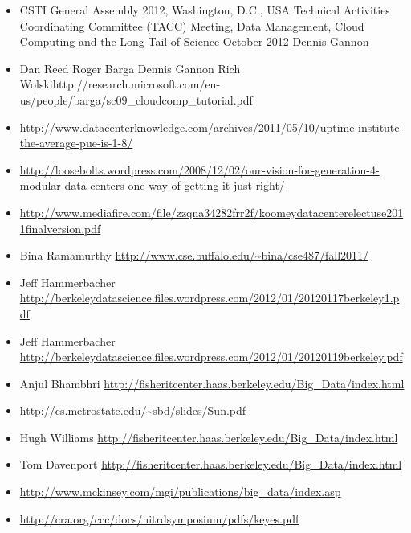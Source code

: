 \begin{itemize}

\item
  CSTI General Assembly 2012, Washington, D.C., USA Technical Activities
  Coordinating Committee (TACC) Meeting, Data Management, Cloud
  Computing and the Long Tail of Science October 2012 Dennis Gannon
\item
  Dan Reed Roger Barga Dennis Gannon Rich
  Wolskihttp://research.microsoft.com/en-us/people/barga/sc09\_cloudcomp\_tutorial.pdf
\item
  \url{http://www.datacenterknowledge.com/archives/2011/05/10/uptime-institute-the-average-pue-is-1-8/}
\item
  \url{http://loosebolts.wordpress.com/2008/12/02/our-vision-for-generation-4-modular-data-centers-one-way-of-getting-it-just-right/}
\item
  \url{http://www.mediafire.com/file/zzqna34282frr2f/koomeydatacenterelectuse2011finalversion.pdf}
\item
  Bina Ramamurthy
  \url{http://www.cse.buffalo.edu/~bina/cse487/fall2011/}
\item
  Jeff Hammerbacher
  \url{http://berkeleydatascience.files.wordpress.com/2012/01/20120117berkeley1.pdf}
\item
  Jeff Hammerbacher
  \url{http://berkeleydatascience.files.wordpress.com/2012/01/20120119berkeley.pdf}
\item
  Anjul Bhambhri
  \url{http://fisheritcenter.haas.berkeley.edu/Big_Data/index.html}
\item
  \url{http://cs.metrostate.edu/~sbd/slides/Sun.pdf}
\item
  Hugh Williams
  \url{http://fisheritcenter.haas.berkeley.edu/Big_Data/index.html}
\item
  Tom Davenport
  \url{http://fisheritcenter.haas.berkeley.edu/Big_Data/index.html}
\item
  \url{http://www.mckinsey.com/mgi/publications/big_data/index.asp}
\item
  \url{http://cra.org/ccc/docs/nitrdsymposium/pdfs/keyes.pdf}
\end{itemize}
